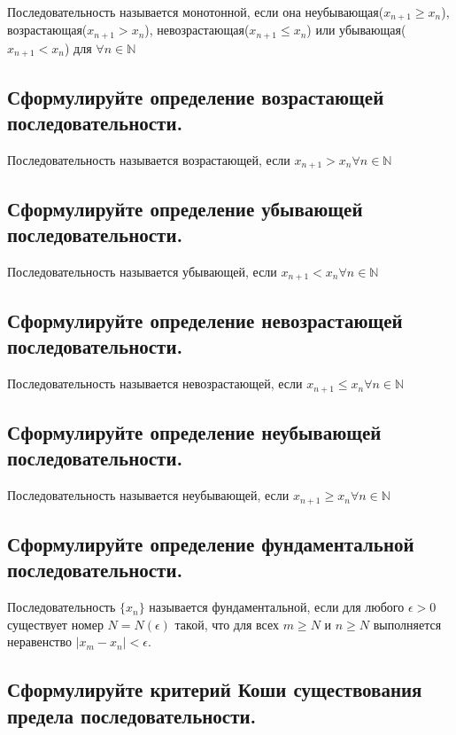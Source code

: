 \documentclass[a4paper, 10pt]{article}
\begin{document}
    Последовательность называется монотонной, если она неубывающая($x_{n+1} \geqslant x_n$), возрастающая($x_{n+1}>x_n$), 
    невозрастающая($x_{n+1} \leqslant x_n$) или убывающая($x_{n+1}<x_n$) для $\forall n \in \mathbb{N}$

    \subsection{Сформулируйте определение возрастающей последовательности.}

    Последовательность называется возрастающей, если $x_{n+1} > x_n \forall n \in \mathbb{N}$
        
    \subsection{Сформулируйте определение убывающей последовательности.}

    Последовательность называется убывающей, если $x_{n+1} < x_n \forall n \in \mathbb{N}$
        
    \subsection{Сформулируйте определение невозрастающей последовательности.}
    
    Последовательность называется невозрастающей, если $x_{n+1} \leqslant x_n \forall n \in \mathbb{N}$
        
    \subsection{Сформулируйте определение неубывающей последовательности.}
    
    Последовательность называется неубывающей, если $x_{n+1} \geqslant x_n \forall n \in \mathbb{N}$
    
    \subsection{Сформулируйте определение фундаментальной последовательности.}
    
    Последовательность $\{x_n\}$ называется фундаментальной, если для любого $\epsilon > 0$ 
    существует номер $N = N(\epsilon)$ такой, что для всех $m  \geqslant  N$ и $n  \geqslant  N$ выполняется 
    неравенство $| x_m - x_n | < \epsilon$.

    \subsection{Сформулируйте критерий Коши существования предела последовательности.}
\end{document}
